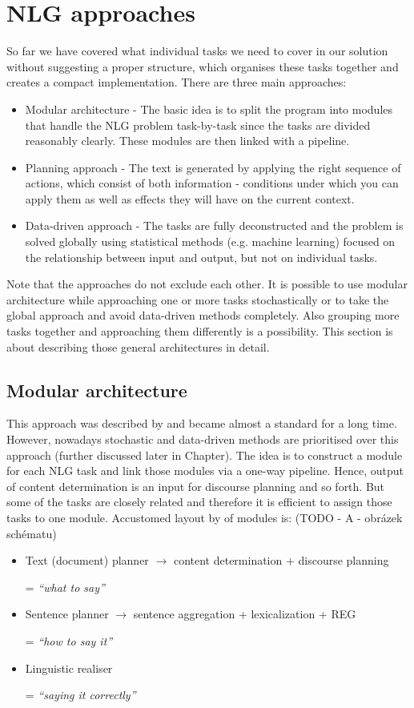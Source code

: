 \chapter{NLG approaches}\label{chap:approaches}
So far we have covered what individual tasks we need to cover in our solution without suggesting a proper structure, which organises these tasks together and creates a compact implementation. There are three main approaches:
\begin{itemize}
	\item Modular architecture - The basic idea is to split the program into modules that handle the NLG problem task-by-task since the tasks are divided reasonably clearly. These modules are then linked with a pipeline. 
	\item Planning approach - The text is generated by applying the right sequence of actions, which consist of both information - conditions under which you can apply them as well as effects they will have on the current context.
	\item Data-driven approach - The tasks are fully deconstructed and the problem is solved globally using statistical methods (e.g. machine learning) focused on the relationship between input and output, but not on individual tasks. 
\end{itemize}
Note that the approaches do not exclude each other. It is possible to use modular architecture while approaching one or more tasks stochastically or to take the global approach and avoid data-driven methods completely. Also grouping more tasks together and approaching them differently is a possibility. This section is about describing those general architectures in detail.

\section{Modular architecture}
This approach was described by \cite{reiter1997building} and became almost a standard for a long time. However, nowadays stochastic and data-driven methods are prioritised over this approach (further discussed later in Chapter). The idea is to construct a module for each NLG task and link those modules via a one-way pipeline. Hence, output of content determination is an input for discourse planning and so forth. But some of the tasks are closely related and therefore it is efficient to assign those tasks to one module. Accustomed layout by \cite{reiter1997building} of modules is: (TODO - A - obrázek schématu)
\begin{itemize}
	\item Text (document) planner $\rightarrow$ content determination + discourse planning
	
	= \emph{“what to say”}
	\item Sentence planner $\rightarrow$ sentence aggregation + lexicalization + REG
	
	= \emph{“how to say it”}
	\item Linguistic realiser
	
	= \emph{“saying it correctly”}
\end{itemize}

